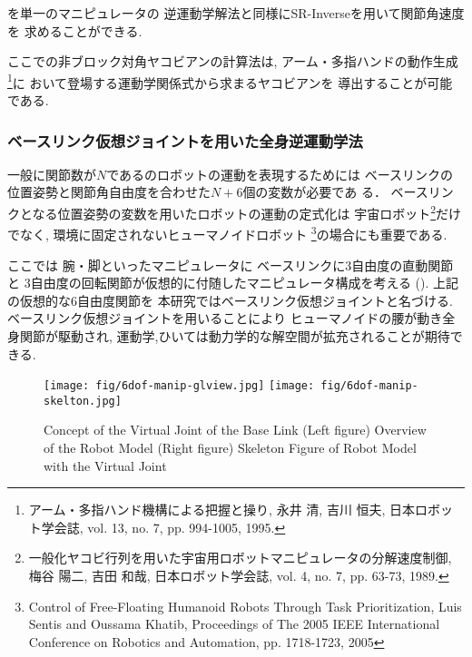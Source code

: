 を単一のマニピュレータの
逆運動学解法と同様にSR-Inverseを用いて関節角速度を
求めることができる.

ここでの非ブロック対角ヤコビアンの計算法は,
アーム・多指ハンドの動作生成
\footnote{
アーム・多指ハンド機構による把握と操り, 永井 清, 吉川 恒夫,
日本ロボット学会誌, vol. 13, no. 7, pp. 994-1005, 1995.
}に
おいて登場する運動学関係式から求まるヤコビアンを
導出することが可能である.

\subsubsection{ベースリンク仮想ジョイントを用いた全身逆運動学法}
一般に関節数が$N$であるのロボットの運動を表現するためには
ベースリンクの位置姿勢と関節角自由度を合わせた$N+6$個の変数が必要であ
る．
ベースリンクとなる位置姿勢の変数を用いたロボットの運動の定式化は
宇宙ロボット\footnote{
一般化ヤコビ行列を用いた宇宙用ロボットマニピュレータの分解速度制御,
梅谷 陽二, 吉田 和哉,
日本ロボット学会誌, vol. 4, no. 7, pp. 63-73, 1989.
}だけでなく,
環境に固定されないヒューマノイドロボット
\footnote{
Control of Free-Floating Humanoid Robots Through Task Prioritization,
Luis Sentis and Oussama Khatib,
Proceedings of The 2005 IEEE International Conference on Robotics and Automation,
pp. 1718-1723, 2005
}の場合にも重要である.

ここでは
腕・脚といったマニピュレータに
ベースリンクに3自由度の直動関節と
3自由度の回転関節が仮想的に付随したマニピュレータ構成を考える
().
上記の仮想的な6自由度関節を
本研究ではベースリンク仮想ジョイントと名づける.
ベースリンク仮想ジョイントを用いることにより
ヒューマノイドの腰が動き全身関節が駆動され,
運動学,ひいては動力学的な解空間が拡充されることが期待できる.
\begin{figure}[htb]
  \begin{center}
    \texttt{[image: fig/6dof-manip-glview.jpg]}
    \texttt{[image: fig/6dof-manip-skelton.jpg]}
    \caption{Concept of the Virtual Joint of the Base Link\newline
      (Left figure) Overview of the Robot Model\newline
      (Right figure) Skeleton Figure of Robot Model with the Virtual Joint
    }
  \end{center}
\end{figure}


